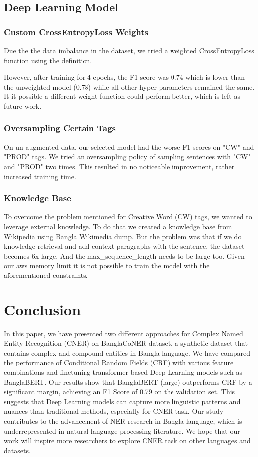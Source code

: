 \documentclass{article}
\begin{document}
\subsection{Deep Learning Model}
\subsubsection{Custom CrossEntropyLoss Weights}

Due the the data imbalance in the dataset, we tried a weighted CrossEntropyLoss function using the definition.

However, after training for 4 epochs, the F1 score was 0.74 which is lower than the unweighted model (0.78) while all other hyper-parameters remained the same. It it possible a different weight function could perform better, which is left as future work.

\subsubsection{Oversampling Certain Tags}
On un-augmented data, our selected model had the worse F1 scores on "CW" and "PROD" tags. We tried an oversampling policy of sampling sentences with "CW" and "PROD" two times. This resulted in no noticeable improvement, rather increased training time.

\subsubsection{Knowledge Base}
To overcome the problem mentioned for Creative Word (CW) tags, we wanted to leverage external knowledge. To do that we created a knowledge base from Wikipedia using Bangla Wikimedia dump. But the problem was that if we do knowledge retrieval and add context paragraphs with the sentence, the dataset becomes 6x large. And the max\_sequence\_length needs to be large too. Given our aws memory limit it is not possible to train the model with the aforementioned constraints. 

\section{Conclusion}
\label{sec:conclusion}

In this paper, we have presented two different approaches for Complex Named Entity Recognition (CNER) on BanglaCoNER dataset, a synthetic dataset that contains complex and compound entities in Bangla language. We have compared the performance of Conditional Random Fields (CRF) with various feature combinations and finetuning transformer based Deep Learning models such as BanglaBERT. Our results show that BanglaBERT (large) outperforms CRF by a significant margin, achieving an F1 Score of 0.79 on the validation set. This suggests that Deep Learning models can capture more linguistic patterns and nuances than traditional methods, especially for CNER task. Our study contributes to the advancement of NER research in Bangla language, which is underrepresented in natural language processing literature. We hope that our work will inspire more researchers to explore CNER task on other languages and datasets.



\end{document}
